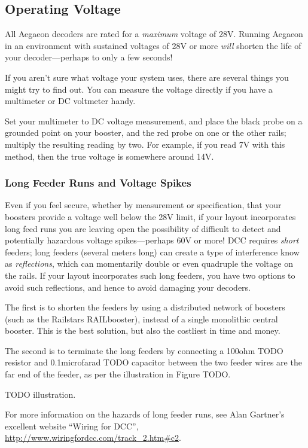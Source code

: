 \documentclass[12pt,letterpaper,draft]{memoir} %
\begin{document}
\subsection{Operating Voltage}

All Aegaeon decoders are rated for a \textit{maximum} voltage of 28V. Running Aegaeon in an environment with sustained voltages of 28V or more \textit{will} shorten the life of your decoder---perhaps to only a few seconds!

If you aren't sure what voltage your system uses, there are several things you might try to find out. You can measure the voltage directly if you have a multimeter or DC voltmeter handy.

Set your multimeter to DC voltage measurement, and place the black probe on a grounded point on your booster, and the red probe on one or the other rails; multiply the resulting reading by two. For example, if you read 7V with this method, then the true voltage is somewhere around 14V.

\subsubsection{Long Feeder Runs and Voltage Spikes}
Even if you feel secure, whether by measurement or specification, that your boosters provide a voltage well below the 28V limit, if your layout incorporates long feed runs you are leaving open the possibility of difficult to detect and potentially hazardous voltage spikes---perhaps 60V or more! DCC requires \textit{short} feeders; long feeders (several meters long) can create a type of interference know as \textit{reflections}, which can momentarily double or even quadruple the voltage on the rails. If your layout incorporates such long feeders, you have two options to avoid such reflections, and hence to avoid damaging your decoders.

The first is to shorten the feeders by using a distributed network of boosters (such as the Railstars RAILbooster), instead of a single monolithic central booster. This is the best solution, but also the costliest in time and money.

The second is to terminate the long feeders by connecting a 100ohm TODO resistor and 0.1microfarad TODO capacitor between the two feeder wires are the far end of the feeder, as per the illustration in Figure TODO.

TODO illustration.

For more information on the hazards of long feeder runs, see Alan Gartner's excellent website ``Wiring for DCC'', \url{http://www.wiringfordcc.com/track_2.htm#c2}.
\end{document}

